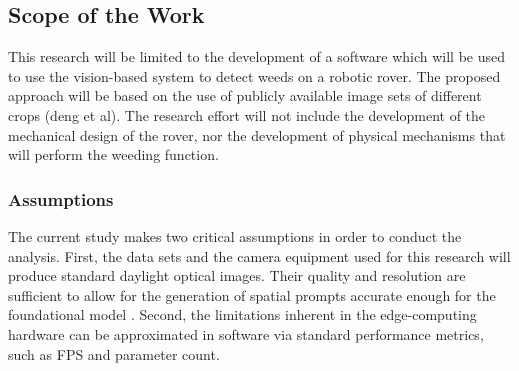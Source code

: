 \subsection{Scope of the Work}

This research will be limited to the development of a software which will be used to use the vision-based system to detect weeds on a robotic rover. The proposed approach will be based on the use of publicly available image sets of different crops (deng et al). The research effort will not include the development of the mechanical design of the rover, nor the development of physical mechanisms that will perform the weeding function.

\subsubsection{Assumptions}

The current study makes two critical assumptions in order to conduct the analysis. First, the data sets and the camera equipment used for this research will produce standard daylight optical images. Their quality and resolution are sufficient to allow for the generation of spatial prompts accurate enough for the foundational model \cite{ghose2025}. Second, the limitations inherent in the edge-computing hardware can be approximated in software via standard performance metrics, such as FPS and parameter count.
